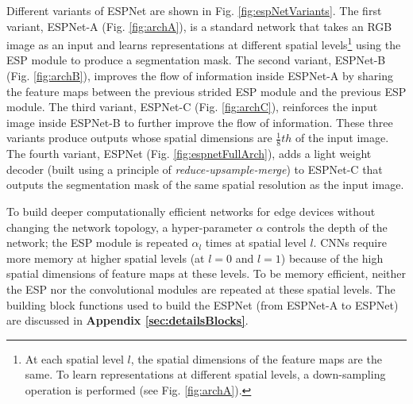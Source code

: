 \documentclass[runningheads]{llncs}
\def\Fig{Fig. }
\begin{document}
Different variants of ESPNet are shown in \Fig \ref{fig:espNetVariants}. The first variant, ESPNet-A (\Fig \ref{fig:archA}), is a standard network that takes an RGB image as an input and learns representations at different spatial levels\footnote{At each spatial level $l$, the spatial dimensions of the feature maps are the same. To learn representations at different spatial levels, a down-sampling operation is performed (see \Fig \ref{fig:archA}).} using the ESP module to produce a segmentation mask. The second variant, ESPNet-B (\Fig \ref{fig:archB}), improves the flow of information inside ESPNet-A by sharing the feature maps between the previous strided ESP module and the previous ESP module. The third variant, ESPNet-C (\Fig \ref{fig:archC}), reinforces the input image inside ESPNet-B to further improve the flow of information. These three variants produce outputs whose spatial dimensions are $\frac{1}{8}{th}$ of the input image. The fourth variant, ESPNet (\Fig \ref{fig:espnetFullArch}), adds a light weight decoder (built using a principle of \textit{reduce-upsample-merge}) to ESPNet-C that outputs the segmentation mask of the same spatial resolution as the input image. 

To build deeper computationally efficient networks for edge devices without changing the network topology,  a hyper-parameter $\alpha$  controls the depth of the network;  the ESP module is repeated $\alpha_l$ times at spatial level $l$. CNNs require more memory at higher spatial levels (at $l=0$ and $l=1$) because of the high spatial dimensions of feature maps at these levels. To be memory efficient, neither the ESP nor the convolutional modules are repeated at these spatial levels. The building block functions used to build the ESPNet (from ESPNet-A to ESPNet) are discussed in \textbf{Appendix \ref{sec:detailsBlocks}}. 
\end{document}
